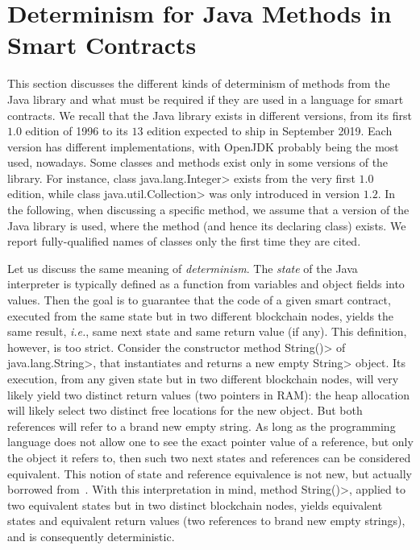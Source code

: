 \section{Determinism for Java Methods in Smart Contracts}\label{sec:determinism}

This section discusses the different kinds of determinism of methods from
the Java library and what must be required if they are used
in a language for smart contracts.
We recall that the Java library exists in different versions, from its first
$1.0$ edition of 1996 to its $13$ edition expected to ship in September 2019.
Each version has different implementations, with OpenJDK probably being
the most used, nowadays. Some classes and methods exist only in some versions of the library.
For instance, class \<java.lang.Integer> exists from the very first $1.0$ edition,
while class \<java.util.Collection> was only introduced in version $1.2$.
In the following, when discussing a specific method, we assume that a version
of the Java library is used, where the method (and hence its declaring class) exists.
We report fully-qualified names of classes only the first time they are cited.

Let us discuss the same meaning of \emph{determinism}.
The \emph{state} of the Java interpreter is typically defined
as a function from variables and object fields into values.
Then the goal is to guarantee that the code of a given smart contract, executed
from the same state but in two different blockchain nodes, yields the same result, \emph{i.e.},
same next state and same return value (if any).
This definition, however, is too strict. Consider the constructor method
\<String()> of \<java.lang.String>, that instantiates and returns a new empty \<String>
object. Its execution, from any given state but in two different blockchain nodes,
will very likely yield two distinct
return values (two pointers in RAM): the heap allocation will likely
select two distinct free locations for the new object.
But both references will refer to a brand new empty string.
As long as the programming language does not allow one to see
the exact pointer value of a reference, but only the object it refers to,
then such two next states and references can be considered equivalent.
This notion of state and reference equivalence is not new, but actually borrowed
from~\cite{BanerjeeN05,BarthePR13}.
With this interpretation in mind, method \<String()>, applied to two equivalent
states but in two distinct blockchain nodes,
yields equivalent states and equivalent return values (two references to
brand new empty strings), and is consequently deterministic.

